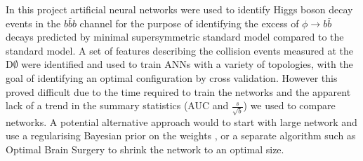 
In this project artificial neural networks were used to identify Higgs boson decay events in the $b\bar{b}b$ channel for the purpose of identifying the excess of $\phi \rightarrow b\bar{b} $ decays predicted by minimal supersymmetric standard model compared to the standard model. A set of features describing the collision events measured at the D$\emptyset$ were identified and used to train ANNs with a variety of topologies, with the goal of identifying an optimal configuration by cross validation. However this proved difficult due to the time required to train the networks and the apparent lack of a trend in the summary statistics (AUC and $\frac{s}{\sqrt{b}}$) we used to compare networks. A potential alternative approach would to start with large network and use a regularising Bayesian prior on the weights \cite{murphy2012machine}, or a separate algorithm such as Optimal Brain Surgery\cite{hassibi1993optimal} to shrink the network to an optimal size.